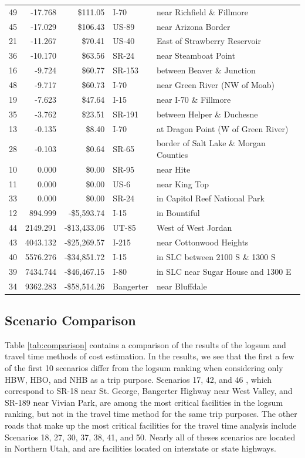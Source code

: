 \begin{table}
\begin{tabular}[t]{crrll}
49 & -17.768 & \$111.05 & I-70 & near Richfield \& Fillmore\\
45 & -17.029 & \$106.43 & US-89 & near Arizona Border\\
21 & -11.267 & \$70.41 & US-40 & East of Strawberry Reservoir\\
36 & -10.170 & \$63.56 & SR-24 & near Steamboat Point\\
16 & -9.724 & \$60.77 & SR-153 & between Beaver \& Junction\\
48 & -9.717 & \$60.73 & I-70 & near Green River (NW of Moab)\\
19 & -7.623 & \$47.64 & I-15 & near I-70 \& Fillmore\\
35 & -3.762 & \$23.51 & SR-191 & between Helper \& Duchesne\\
13 & -0.135 & \$8.40 & I-70 & at Dragon Point (W of Green River)\\
28 & -0.103 & \$0.64 & SR-65 & border of Salt Lake \& Morgan Counties\\
10 & 0.000 & \$0.00 & SR-95 & near Hite\\
11 & 0.000 & \$0.00 & US-6 & near King Top\\
33 & 0.000 & \$0.00 & SR-24 & in Capitol Reef National Park\\
12 & 894.999 & -\$5,593.74 & I-15 & in Bountiful\\
44 & 2149.291 & -\$13,433.06 & UT-85 & West of West Jordan\\
43 & 4043.132 & -\$25,269.57 & I-215 & near Cottonwood Heights\\
40 & 5576.276 & -\$34,851.72 & I-15 & in SLC between 2100 S \& 1300 S\\
39 & 7434.744 & -\$46,467.15 & I-80 & in SLC near Sugar House and 1300 E\\
34 & 9362.283 & -\$58,514.26 & Bangerter & near Bluffdale\\
\bottomrule
\end{tabular}
\end{table}


\subsection{Scenario Comparison}
Table \ref{tab:comparison} contains a comparison of the results of the logsum
and travel time methods of cost estimation. In the results, we see that the first
a few of the first 10 scenarios differ from the logsum ranking when considering
only HBW, HBO, and NHB as a trip purpose. Scenarios 17, 42, and 46 , which
correspond to SR-18 near St. George, Bangerter Highway near West Valley, and SR-189
near Vivian Park, are among the
most critical facilities in the logsum ranking, but not in the travel time method
for the same trip purposes. The other roads that make up the most critical facilities
for the travel time analysis include Scenarios 18, 27, 30, 37, 38, 41, and 50.
Nearly all of theses scenarios are located in Northern Utah, and are facilities
located on interstate or state highways.

